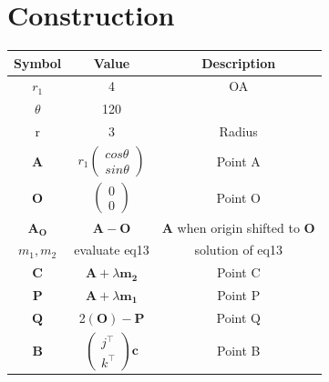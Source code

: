 \documentclass[journal,10pt,twocolumn]{article}
\let\vec\mathbf
\newcommand{\myvec}[1]{\ensuremath{\begin{pmatrix}#1\end{pmatrix}}}
\begin{document}
\section*{\large Construction}
{
\setlength\extrarowheight{5pt}
\begin{tabular}{|c|c|c|}
  \hline
  \textbf{Symbol}&\textbf{Value}&\textbf{Description}\\
  \hline
	$r_1$&4&OA \\
  \hline
	$\theta$&120&\\
  \hline
  r&$3$&Radius\\
  \hline
	$\vec{A}$&$r_1\myvec{cos{\theta}\\sin{\theta}}$&Point A\\[5pt]
	\hline
	$\vec{O}$&$\myvec{0\\0}$&Point O\\[5pt]
	\hline
	$\vec{A_O}$&$\vec{A-O}$&$\vec{A}$ when origin shifted to $\vec{O}$\\[5pt]
  \hline
  $m_1,m_2$&evaluate  eq13 &solution of eq13\\[5pt] 
  \hline
	$\vec{C}$&$\vec{A}+\lambda\vec{m_2}$&Point C\\[5pt]
  \hline
	$\vec{P}$&$\vec{A}+\lambda\vec{m_1}$&Point P\\[5pt]
	\hline
	$\vec{Q}$&2$(\vec{O})-\vec{P}$& Point Q\\
	\hline
	$\vec{B}$&$\myvec{j^\top\\k^\top}\vec{c}$&Point B\\[5pt]
	\hline
\end{tabular}
}
\end{document}
